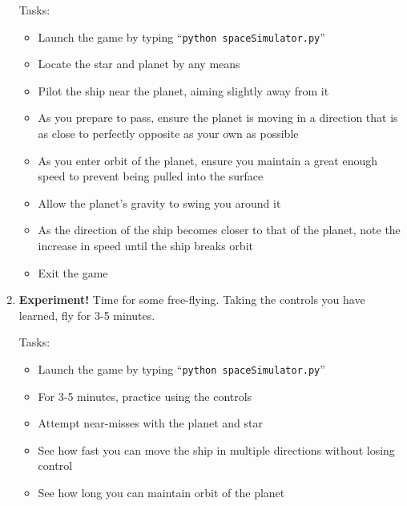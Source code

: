 \begin{enumerate}
  Tasks:
  \begin{itemize}
    \item Launch the game by typing ``\texttt{python spaceSimulator.py}''
    \item Locate the star and planet by any means
    \item Pilot the ship near the planet, aiming slightly away from it
    \item As you prepare to pass, ensure the planet is moving in a direction that is as close to perfectly opposite as your own as possible
    \item As you enter orbit of the planet, ensure you maintain a great enough speed to prevent being pulled into the surface
    \item Allow the planet's gravity to swing you around it
    \item As the direction of the ship becomes closer to that of the planet, note the increase in speed until the ship breaks orbit
    \item Exit the game
  \end{itemize}

  \item \textbf{Experiment!}  Time for some free-flying.  Taking the controls you have learned, fly for 3-5 minutes. 
  
  Tasks:
  \begin{itemize}
    \item Launch the game by typing ``\texttt{python spaceSimulator.py}''
    \item For 3-5 minutes, practice using the controls
    \item Attempt near-misses with the planet and star
    \item See how fast you can move the ship in multiple directions without losing control
    \item See how long you can maintain orbit of the planet
  \end{itemize}

\end{enumerate}




